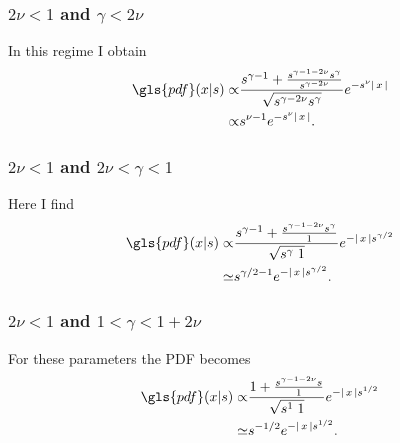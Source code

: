 \subsubsection{$2\nu<1$ and $\gamma< 2\nu$ }

In this regime I obtain  
%
\begin{align}
\gls{pdf}(x|s) \propto & \frac{s^{\gamma-1}+\frac{s^{\gamma-1-2\nu} s^{\gamma}}{s^{\gamma-2\nu}}}{\sqrt{s^{\gamma -2\nu}s^{\gamma}}} e^{-s^{\nu} \abs{x}} \\
\propto & s^{\nu - 1} e^{-s^{\nu} \abs{x}} .
\end{align}
%

\subsubsection{$2\nu<1$ and $2\nu <\gamma< 1$ }

Here I find 
%
\begin{align}
\gls{pdf}(x|s) \propto & \frac{s^{\gamma-1}+\frac{s^{\gamma-1-2\nu} s^{\gamma}}{1}}{\sqrt{s^{\gamma } \; 1}} e^{-\abs{x} s^{\gamma/2}} \\
\simeq & s^{\gamma/2-1} e^{-\abs{x} s^{\gamma/2}} .
\end{align}
%

\subsubsection{$2\nu<1$ and $1 <\gamma< 1+2\nu$}

For these parameters the \gls{PDF} becomes
%
\begin{align}
\gls{pdf}(x|s) \propto & \frac{1+\frac{s^{\gamma-1-2\nu} s}{1}}{\sqrt{s^{1} \; 1}} e^{-\abs{x} s^{1/2}} \\
\simeq & s^{-1/2} e^{-\abs{x} s^{1/2}} .
\end{align}
%

